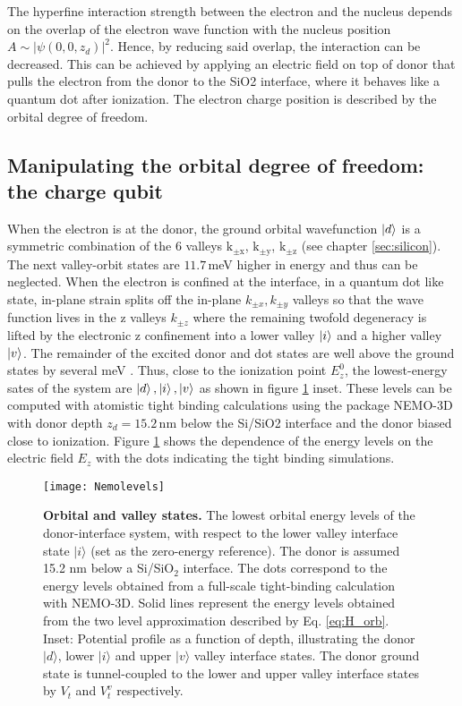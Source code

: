 The hyperfine interaction strength between the electron and the nucleus depends on the overlap of the electron wave function with the nucleus position $A\sim |\psi(0,0,z_d)|^2$. Hence, by reducing said overlap, the interaction can be decreased. This can be achieved by applying an electric field on top of donor that pulls the electron from the donor to the SiO2 interface, where it behaves like a quantum dot after ionization. The electron charge position is described by the orbital degree of freedom.

\subsection{Manipulating the orbital degree of freedom: the charge qubit} \label{sec:chargequbit}

When the electron is at the donor, the ground orbital wavefunction $\ket{d}$ is a symmetric combination of the 6 valleys $\mathrm{k_{\pm x}}$, $\mathrm{k_{\pm y}} $, $\mathrm{k_{\pm z}} $ (see chapter \ref{sec:silicon}). The next valley-orbit states are $11.7\,$meV higher in energy and thus can be neglected. When the electron is confined at the interface, in a quantum dot like state, in-plane strain splits off the in-plane $k_{\pm x}, k_{\pm y}$ valleys so that the wave function lives in the z valleys $k_{\pm z}$ where the remaining twofold degeneracy is lifted by the electronic z confinement into a lower valley $\ket{i}$ and a higher valley $\ket{v}$. The remainder of the excited donor and dot states are well above the ground states by several meV \cite{Rahman2009, Calderon2009}. Thus, close to the ionization point $E_z^0$, the lowest-energy sates of the system are $\ket{d}, \ket{i}, \ket{v}$ as shown in figure \ref{fig:nemolevels} inset. 
These levels can be computed with atomistic tight binding calculations using the package NEMO-3D \cite{Klimeck2007a, Klimeck2007b} with donor depth $z_d=15.2\,$nm below the Si/SiO2 interface and the donor biased close to ionization. Figure \ref{fig:nemolevels} shows the dependence of the energy levels on the electric field $E_z$ with the dots indicating the tight binding simulations. 

\begin{figure}[h]
	\centering
	\texttt{[image: Nemolevels]}
	\caption[Orbital and valley states]{\textbf{Orbital and valley states.} The lowest orbital energy levels of the donor-interface system, with respect to the lower valley interface state $\lvert i \rangle$ (set as the zero-energy reference). The donor is assumed 15.2 nm below a Si/SiO$_2$ interface. The dots correspond to the energy levels obtained from a full-scale tight-binding calculation with NEMO-3D. Solid lines represent the energy levels obtained from the two level approximation described by Eq. \ref{eq:H_orb}. Inset: Potential profile as a function of depth, illustrating the donor $\lvert d \rangle$, lower $\lvert i \rangle$ and upper $\lvert v \rangle$ valley interface states. The donor ground state is tunnel-coupled to the lower and upper valley interface states by $V_t$ and $V_t^v$  respectively.}
	\label{fig:nemolevels}
\end{figure}

